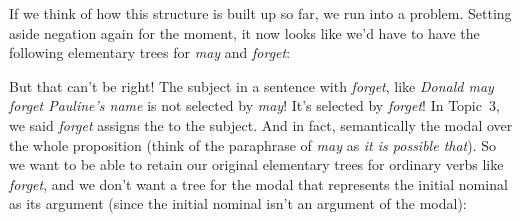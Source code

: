 \documentclass{article}
\begin{document}
If we think of how this structure is built up so far, we run into a problem. Setting aside negation again for the moment, it now looks like we'd have to have the following elementary trees for \emph{may} and \emph{forget}:
\begin{exe}
\end{exe}
But that can't be right!
The subject in a sentence with \emph{forget}, like \emph{Donald may forget Pauline's name} is not selected by \emph{may}!
It's selected by \emph{forget}!
In Topic~3, we said \emph{forget} assigns the  to the subject.
And in fact, semantically the modal  over the whole proposition (think of the paraphrase of \emph{may} as \emph{it is possible that}).
So we want to be able to retain our original elementary trees for ordinary verbs like \emph{forget}, and we don't want a tree for the modal that represents the initial nominal as its argument (since the initial nominal isn't an argument of the modal):
\begin{exe}
\end{exe}        
\end{document}
